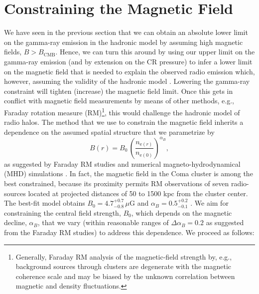 \documentclass[12pt,manuscript]{aastex}
\newcommand{\rmn}{\mathrm}
\begin{document}
\section{Constraining the Magnetic Field}
\label{sec:B}
We have seen in the previous section that we can obtain an absolute lower limit on the gamma-ray emission in the hadronic model by assuming high magnetic fields, $B>B_\rmn{CMB}$. Hence, we can turn this around by using our upper limit on the gamma-ray emission (and by extension on the CR pressure) to infer a lower limit on the magnetic field that is needed to explain the observed radio emission which, however, assuming the validity of the hadronic model \citep{article:PfrommerEnsslin:2004a}. Lowering the gamma-ray constraint will tighten (increase) the magnetic field limit. Once this gets in conflict with magnetic field measurements by means of other methods, e.g., Faraday rotation measure (RM)\footnote{Generally, Faraday RM analysis of the magnetic-field strength by, e.g., background sources through clusters are degenerate with the magnetic coherence scale and may be biased by the unknown correlation between magnetic and density fluctuations.}, this would challenge the hadronic model of radio halos. The method that we use to constrain the magnetic field inherits a dependence on the assumed spatial structure that we parametrize by
\begin{equation}
\label{eq:B}
B(r) = B_{0} \,\left(\frac{n_{\rmn{e}(r)}}{n_{\rmn{e}(0)}}\right)^{\alpha_B},
\end{equation}
as suggested by Faraday RM studies and numerical magneto-hydrodynamical (MHD) simulations \citep[][and references therein]{article:Bonafede_etal:2010, article:Bonafede_etal:2011}. In fact, the magnetic field in the Coma cluster is among the best constrained, because its proximity permits RM observations of
seven radio-sources located at projected distances of 50 to 1500 kpc from the cluster center. The best-fit model obtains $B_{0} = 4.7^{+0.7}_{-0.8}\,\mu$G and $\alpha_{B} = 0.5^{+0.2}_{-0.1}$ \citep{article:Bonafede_etal:2010}. We aim for constraining the central field strength, $B_{0}$, which depends on the magnetic decline, $\alpha_{B}$, that we vary (within reasonable ranges of $\Delta\alpha_{B}=0.2$ as suggested from the Faraday RM studies) to address this dependence. We proceed as follows:
\end{document}
